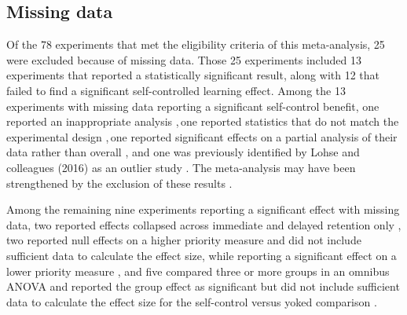 \documentclass[man,floatsintext,hidelinks]{apa7}
\begin{document}
\subsection{Missing data}
Of the 78 experiments that met the eligibility criteria of this meta-analysis, 25 were excluded because of missing data. Those 25 experiments included 13 experiments that reported a statistically significant result, along with 12 that failed to find a significant self-controlled learning effect. Among the 13 experiments with missing data reporting a significant self-control benefit, one reported an inappropriate analysis \parencite{Hemayattalab2013-mq},\footnotemark \,one reported statistics that do not match the experimental design \parencite{Jalalvand2019-im},\footnotemark \,one reported significant effects on a partial analysis of their data rather than overall \parencite{Brydges2009-zb}, and one was previously identified by Lohse and colleagues (2016) as an outlier study \parencite{Carter2012-sj}. The meta-analysis may have been strengthened by the exclusion of these results \parencite{Stanley2010-hb}.



Among the remaining nine experiments reporting a significant effect with missing data, two reported effects collapsed across immediate and delayed retention only \parencite{Patterson2013-nh,Wu2011-ha}, two reported null effects on a higher priority measure and did not include sufficient data to calculate the effect size, while reporting a significant effect on a lower priority measure \parencite[; both studies were included in the primary \emph{p}-curve analysis]{Wulf2001-nb,Wulf2005-sz}, and five compared three or more groups in an omnibus ANOVA and reported the group effect as significant but did not include sufficient data to calculate the effect size for the self-control versus yoked comparison \parencite{Chen2002-vg,Ghorbani2019-yz,Huet2009-wu,Janelle1997-ht,Norouzi2016-cx}.
\end{document}
